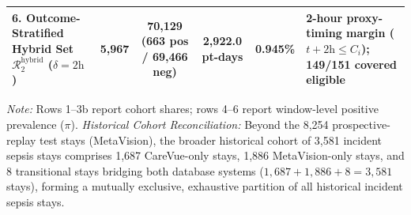 \documentclass[12pt,a4paper]{article}
\begin{document}
\begin{table}[p]
\begin{singlespace}
\begin{tabularx}{\textwidth}{@{}p{3.8cm} c c c c X@{}}
6. Outcome-Stratified Hybrid Set $\mathcal{R}_2^{\mathrm{hybrid}}$ ($\delta=2\text{h}$) & 5,967 & 70,129 (663 pos / 69,466 neg) & 2,922.0 pt-days & 0.945\% & 2-hour proxy-timing margin ($t + 2\text{h} \le C_i$); 149/151 covered eligible \\
\bottomrule
\end{tabularx}
\vspace{0.4em}
\raggedright
\fontsize{7.5pt}{9.2pt}\selectfont
\textit{Note:} Rows 1--3b report cohort shares; rows 4--6 report window-level positive prevalence ($\pi$). \textit{Historical Cohort Reconciliation:} Beyond the 8,254 prospective-replay test stays (MetaVision), the broader historical cohort of 3,581 incident sepsis stays comprises 1,687 CareVue-only stays, 1,886 MetaVision-only stays, and 8 transitional stays bridging both database systems ($1,687 + 1,886 + 8 = 3,581$ stays), forming a mutually exclusive, exhaustive partition of all historical incident sepsis stays.
\end{singlespace}
\end{table}
\end{document}
